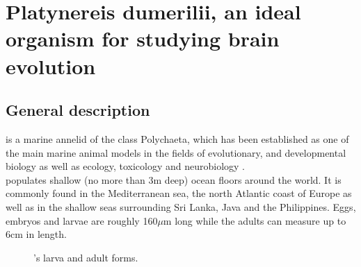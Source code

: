     
\section{Platynereis dumerilii, an ideal organism for studying brain evolution}\label{sec:platynereis}
     \subsection{General description}
     \platyfull{} is a marine annelid of the class Polychaeta, which has been established as one of the main marine animal models in the fields of evolutionary, and developmental biology as well as ecology, toxicology and neurobiology \citep{hutchinson95,tessmar03,hardege99,dorresteijn90,fischer04,Fischer10}.\\
     
     \platy{} populates shallow (no more than 3m deep) ocean floors around the world. It is commonly found in the Mediterranean sea, the north Atlantic coast of Europe as well as in the shallow seas surrounding Sri Lanka, Java and the Philippines. Eggs, embryos and larvae are roughly 160$\mu$m long while the adults can measure up to 6cm in length.
     
     
\begin{figure}[bth]
        \myfloatalign
         \quad
        \caption{\platyfull{}'s larva and adult forms.}\label{fig:platynereis}
\end{figure}
     
